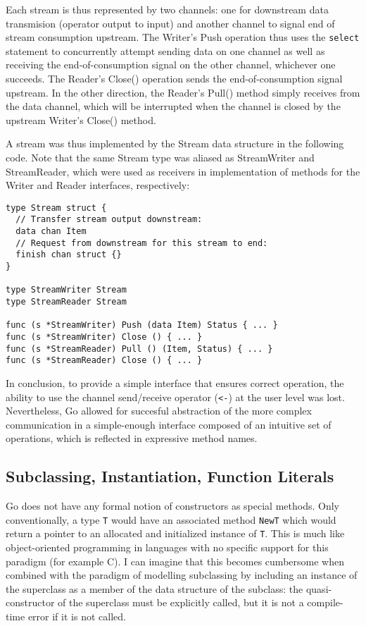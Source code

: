 \documentclass {article}
\begin{document}
Each stream is thus represented by two channels: one for downstream data
transmision (operator output to input) and another channel to signal end of
stream consumption upstream. The Writer's Push operation thus uses the
\lstinline|select| statement to concurrently attempt sending data on one channel
as well as receiving the end-of-consumption signal on the other channel,
whichever one succeeds. The Reader's Close() operation sends the
end-of-consumption signal upstream. In the other direction, the Reader's Pull()
method simply receives from the data channel, which will be interrupted when the
channel is closed by the upstream Writer's Close() method.

A stream was thus implemented by the Stream data structure in the following
code. Note that the same Stream type was aliased as StreamWriter and
StreamReader, which were used as receivers in implementation of methods for the
Writer and Reader interfaces, respectively:

\begin{lstlisting}
type Stream struct {
  // Transfer stream output downstream:
  data chan Item
  // Request from downstream for this stream to end:
  finish chan struct {}
}

type StreamWriter Stream
type StreamReader Stream

func (s *StreamWriter) Push (data Item) Status { ... }
func (s *StreamWriter) Close () { ... }
func (s *StreamReader) Pull () (Item, Status) { ... }
func (s *StreamReader) Close () { ... }
\end{lstlisting}

In conclusion, to provide a simple interface that ensures correct operation, the
ability to use the channel send/receive operator (\lstinline|<-|) at the user
level was lost. Nevertheless, Go allowed for succesful abstraction of the more
complex communication in a simple-enough interface composed of an intuitive set
of operations, which is reflected in expressive method names.


\subsection{Subclassing, Instantiation, Function Literals}

Go does not have any formal notion of constructors as special methods. Only
conventionally, a type \lstinline|T| would have an associated method
\lstinline|NewT| which would return a pointer to an allocated and initialized
instance of \lstinline|T|. This is much like object-oriented programming in
languages with no specific support for this paradigm (for example C). I can
imagine that this becomes cumbersome when combined with the paradigm of
modelling subclassing by including an instance of the superclass as a member of
the data structure of the subclass: the quasi-constructor of the superclass must
be explicitly called, but it is not a compile-time error if it is not called.
\end{document}
